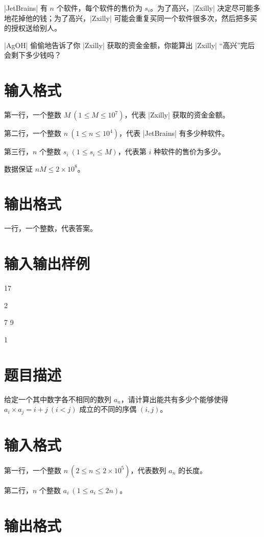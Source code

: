 \documentclass{ctpro}
\begin{document}
|JetBrains| 有 $n$ 个软件，每个软件的售价为 $s_i$。为了高兴，|Zxilly| 决定尽可能多地花掉他的钱；为了高兴，|Zxilly| 可能会重复买同一个软件很多次，然后把多买的授权送给别人。

|AgOH| 偷偷地告诉了你 |Zxilly| 获取的资金金额，你能算出 |Zxilly| “高兴”完后会剩下多少钱吗？

\section*{输入格式}

第一行，一个整数 $M~(1 \leq M \leq {10}^7)$，代表 |Zxilly| 获取的资金金额。

第二行，一个整数 $n~(1 \leq n \leq {10}^4)$，代表 |JetBrains| 有多少种软件。

第三行，$n$ 个整数 $s_i~(1 \leq s_i \leq M)$，代表第 $i$ 种软件的售价为多少。

数据保证 $nM \leq 2 \times {10}^8$。

\section*{输出格式}

一行，一个整数，代表答案。

\section*{输入输出样例}
\testcasetab
{
	17\par
	2\par
	7 9
}
{
	1
}

\makeproblem
\section*{题目描述}

给定一个其中数字各不相同的数列 ${a_n}$，请计算出能共有多少个能够使得 $a_i \times a_j = i+j~(i<j)$ 成立的不同的序偶 $(i,j)$。

\section*{输入格式}

第一行，一个整数 $n~(2 \leq n \leq 2 \times {10}^5)$，代表数列 ${a_n}$ 的长度。

第二行，$n$ 个整数 $a_i~(1 \leq a_i \leq 2n)$。

\section*{输出格式}
\end{document}
